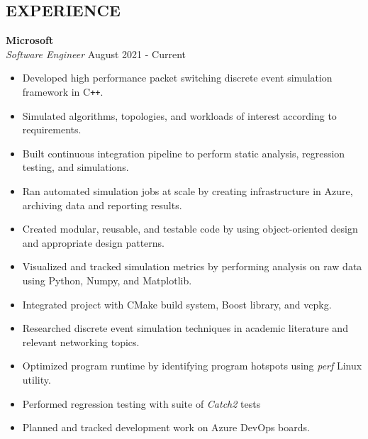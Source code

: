 \documentclass[overlapped]{res}
\begin{document}
\begin{resume}
\section{EXPERIENCE}
\textbf{Microsoft}  \\
{\sl Software Engineer} \hfill August 2021 - Current
\begin{itemize}  \itemsep -2pt %
    \item Developed high performance packet switching discrete event simulation framework in C\texttt{++}.
    \item Simulated algorithms, topologies, and workloads of interest according to requirements.
    \item Built continuous integration pipeline to perform static analysis, regression testing, and simulations.
    \item Ran automated simulation jobs at scale by creating infrastructure in Azure, archiving data and reporting results.
    \item Created modular, reusable, and testable code by using object-oriented design and appropriate design patterns.
    \item Visualized and tracked simulation metrics by performing analysis on raw data using Python, Numpy, and Matplotlib.
    \item Integrated project with CMake build system, Boost library, and vcpkg.
    \item Researched discrete event simulation techniques in academic literature and relevant networking topics.
    \item Optimized program runtime by identifying program hotspots using {\it perf} Linux utility.
    \item Performed regression testing with suite of {\it Catch2} tests
    \item Planned and tracked development work on Azure DevOps boards.
\end{itemize}



\end{resume}
\end{document}
